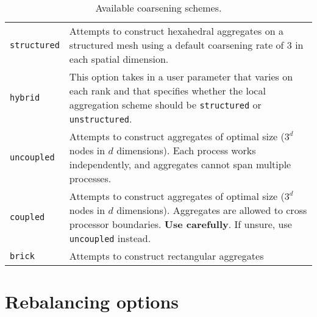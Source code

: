 \begin{table}[H]
  \begin{center}
    \begin{tabular}{p{5.0cm} p{10cm}}
      \toprule
      \verb!structured!   & Attempts to construct hexahedral aggregates on a structured
                            mesh using a default coarsening rate of $3$ in each spatial
                            dimension.\\
      \verb!hybrid!       & This option takes in a user parameter that varies on each
                            rank and that specifies whether the local aggregation
                            scheme should be \verb!structured! or \verb!unstructured!.\\
      \verb!uncoupled!    & Attempts to construct aggregates of optimal size ($3^d$
                            nodes in $d$ dimensions). Each process works independently, and
                            aggregates cannot span multiple processes.\\
      \verb!coupled!      & Attempts to construct aggregates of optimal size ($3^d$
                            nodes in $d$ dimensions). Aggregates are allowed to
                            cross processor boundaries. \textbf{Use carefully}. If
                            unsure, use \verb!uncoupled! instead.\\
      \verb!brick!        & Attempts to construct rectangular aggregates \\
      \bottomrule
    \end{tabular}
    \caption{Available coarsening schemes. }
\label{t:aggregation}
  \end{center}
\end{table}



\section{Rebalancing options}
\label{sec:options_rebalancing}

